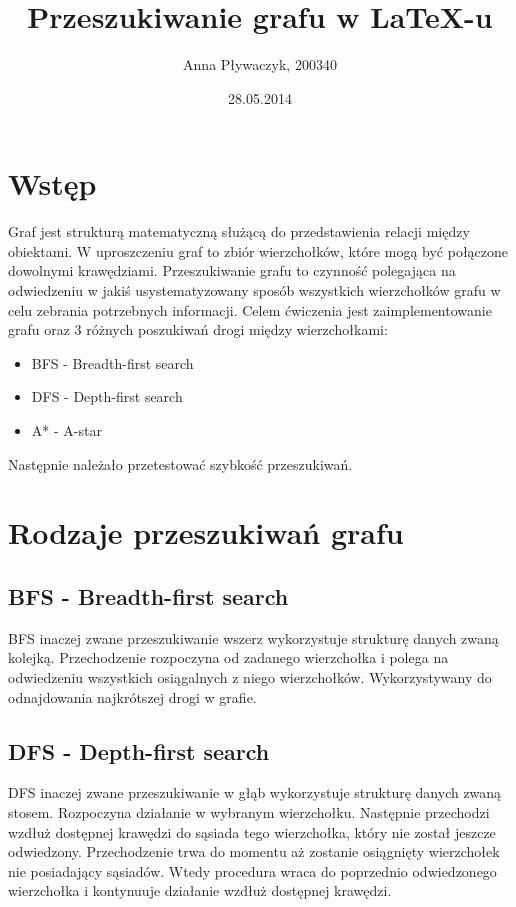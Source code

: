 \documentclass{article}
\author{Anna Pływaczyk, 200340}
\title{Przeszukiwanie grafu w \LaTeX-u }
\date{28.05.2014}
\begin{document}
\maketitle

\section{Wstęp}
Graf jest strukturą matematyczną służącą do przedstawienia relacji między obiektami. W uproszczeniu graf to zbiór wierzchołków, które mogą być połączone dowolnymi krawędziami. 
\newline
Przeszukiwanie grafu to czynność polegająca na odwiedzeniu w jakiś usystematyzowany sposób wszystkich wierzchołków grafu w celu zebrania potrzebnych informacji.  
\newline
Celem ćwiczenia jest zaimplementowanie grafu oraz 3 różnych poszukiwań drogi między wierzchołkami:
\begin{itemize}
\item BFS - Breadth-first search
\item DFS - Depth-first search
\item A* - A-star
\end{itemize}
Następnie należało przetestować szybkość przeszukiwań.
 
\section{Rodzaje przeszukiwań grafu}
\subsection{BFS - Breadth-first search}
BFS inaczej zwane przeszukiwanie wszerz wykorzystuje strukturę danych zwaną kolejką. Przechodzenie rozpoczyna od zadanego wierzchołka i polega na odwiedzeniu wszystkich osiągalnych z niego wierzchołków. Wykorzystywany do odnajdowania najkrótszej drogi w grafie. 
\subsection{DFS - Depth-first search}
DFS inaczej zwane przeszukiwanie w głąb wykorzystuje strukturę danych zwaną stosem. Rozpoczyna działanie w wybranym wierzchołku. Następnie przechodzi wzdłuż dostępnej krawędzi do sąsiada tego wierzchołka, który nie został jeszcze odwiedzony. Przechodzenie trwa do momentu aż zostanie osiągnięty wierzchołek nie posiadający sąsiadów. Wtedy procedura wraca do poprzednio odwiedzonego wierzchołka i kontynuuje działanie wzdłuż dostępnej krawędzi.
\end{document}
